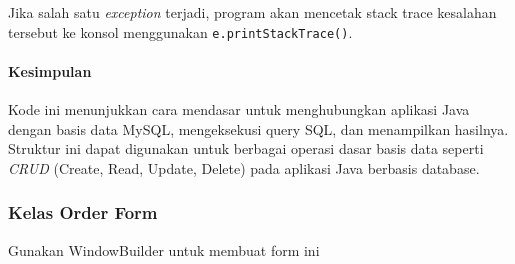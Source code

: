 Jika salah satu \textit{exception} terjadi, program akan mencetak stack trace kesalahan tersebut ke konsol menggunakan \texttt{e.printStackTrace()}.

\paragraph{Kesimpulan}
Kode ini menunjukkan cara mendasar untuk menghubungkan aplikasi Java dengan basis data MySQL, mengeksekusi query SQL, dan menampilkan hasilnya. Struktur ini dapat digunakan untuk berbagai operasi dasar basis data seperti \textit{CRUD} (Create, Read, Update, Delete) pada aplikasi Java berbasis database.

\subsubsection{Kelas Order Form}

Gunakan WindowBuilder untuk membuat form ini

